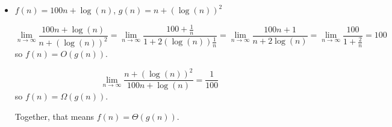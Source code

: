 \documentclass{article}
\begin{document}
\begin{itemize}
\vspace{1pc}
\item $f(n) = 100n + \log(n)$, $g(n) = n + (\log(n))^2$

\[
  \lim_{n\rightarrow\infty} \frac{100n + \log(n)}{n + (\log(n))^2}
=
  \lim_{n\rightarrow\infty} \frac{100 + \frac{1}{n}}{1 + 2(\log(n))\frac{1}{n}}
=
  \lim_{n\rightarrow\infty} \frac{100n + 1}{n + 2\log(n)}
=
  \lim_{n\rightarrow\infty} \frac{100}{1 + \frac{2}{n}} = 100
\]
so $f(n) = O(g(n))$.

\[
  \lim_{n\rightarrow\infty} \frac{n + (\log(n))^2}{100n + \log(n)}
=
  \frac{1}{100}
\]
so $f(n) = \Omega(g(n))$.

Together, that means $f(n) = \Theta(g(n))$.


\end{itemize}
\end{document}
